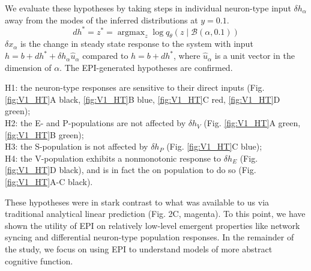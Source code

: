 \documentclass[11pt]{article}
\DeclareMathOperator*{\argmax}{argmax}
\begin{document}
We evaluate these hypotheses by taking steps in individual neuron-type input $\delta h_\alpha$ away from the modes of the inferred distributions at $y=0.1$.
\begin{equation}
dh^* = z^* = \argmax_{z} \log q_\theta(z \mid \mathcal{B}(\alpha, 0.1))
\end{equation}
$\delta x_{\alpha}$ is the change in steady state response to the system with input $h = b + dh^* + \delta h_\alpha \hat{u}_\alpha$ compared to $h = b + dh^*$, where $\hat{u}_\alpha$ is a unit vector in the dimension of $\alpha$. The EPI-generated  hypotheses are confirmed. 

{\addtolength{\leftskip}{10 mm}
H1: the neuron-type responses are sensitive to their direct inputs (Fig. \ref{fig:V1_HT}A black, \ref{fig:V1_HT}B blue, \ref{fig:V1_HT}C red, \ref{fig:V1_HT}D green); \\
H2: the E- and P-populations are not affected by $\delta h_V$ (Fig. \ref{fig:V1_HT}A green, \ref{fig:V1_HT}B green); \\
H3: the S-population is not affected by $\delta h_P$ (Fig. \ref{fig:V1_HT}C blue); \\
H4: the V-population exhibits a nonmonotonic response to $\delta h_E$ (Fig. \ref{fig:V1_HT}D black), and is in fact the on population to do so (Fig. \ref{fig:V1_HT}A-C black).

}

These hypotheses were in stark contrast to what was available to us via traditional analytical linear prediction (Fig. 2C, magenta).
To this point, we have shown the utility of EPI on relatively low-level emergent properties like network syncing and differential neuron-type population responses.  
In the remainder of the study, we focus on using EPI to understand models of more abstract cognitive function.

\end{document}
